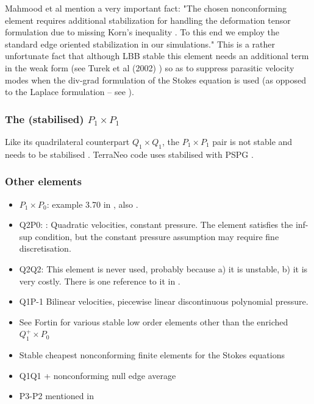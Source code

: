 Mahmood et al \cite{maky17} mention a very important fact: "The chosen nonconforming element requires
additional stabilization for handling the deformation tensor formulation due to missing Korn’s inequality 
\cite{horg95,knob00}.
To this end we employ the standard edge oriented stabilization \cite{tuos02,tuou07} in our simulations."
This is a rather unfortunate fact that although LBB stable this element needs an additional 
term in the weak form (see Turek et al (2002) \cite{tuos02}) 
so as to suppress parasitic velocity modes when the div-grad formulation 
of the Stokes equation is used (as opposed to the Laplace formulation -- see \cite[Section 6.5.2]{dohu03}).





\subsubsection{The (stabilised) $P_1\times P_1$} \label{ss:P1P1stab}

Like its quadrilateral counterpart $Q_1\times Q_1$, the 
$P_1\times P_1$ pair is not stable and needs to be stabilised \cite{nosi98,tasu00}.
TerraNeo code uses stabilised with PSPG \cite{babd20}.





\subsubsection{Other elements}

\begin{itemize}
\item $P_1\times P_0$: example 3.70 in \cite{john16}, also \cite{john98}. 
\item Q2P0: : 
Quadratic velocities, constant pressure. The element satisfies the inf-sup condition, but the constant pressure assumption may require fine discretisation.

\item Q2Q2: This element is never used, probably because a) it is unstable, b) it is very costly. 
There is one reference to it in \cite{hufb86}.
\item Q1P-1 Bilinear velocities,  piecewise linear discontinuous polynomial pressure.
\item See Fortin \cite{fort81} for various stable low order elements other than the enriched $Q_1^+ \times P_0$
\item Stable cheapest nonconforming finite elements for the Stokes equations \cite{kiys16}
\item Q1Q1 + nonconforming null edge average \cite{fros07}
\item P3-P2 mentioned in \cite{sten90}   

\end{itemize}

